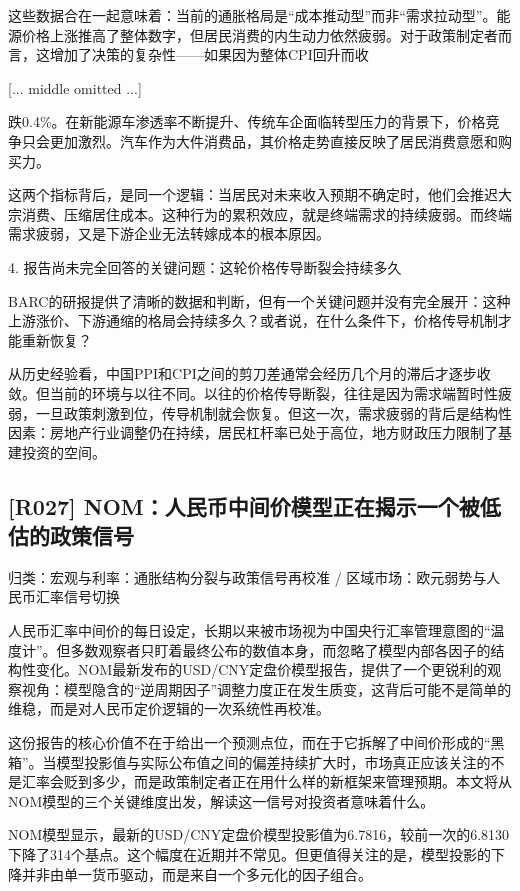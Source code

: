 \documentclass[11pt]{ctexart}
\begin{document}
这些数据合在一起意味着：当前的通胀格局是“成本推动型”而非“需求拉动型”。能源价格上涨推高了整体数字，但居民消费的内生动力依然疲弱。对于政策制定者而言，这增加了决策的复杂性——如果因为整体CPI回升而收

[... middle omitted ...]

跌0.4\%。在新能源车渗透率不断提升、传统车企面临转型压力的背景下，价格竞争只会更加激烈。汽车作为大件消费品，其价格走势直接反映了居民消费意愿和购买力。

这两个指标背后，是同一个逻辑：当居民对未来收入预期不确定时，他们会推迟大宗消费、压缩居住成本。这种行为的累积效应，就是终端需求的持续疲弱。而终端需求疲弱，又是下游企业无法转嫁成本的根本原因。

4. 报告尚未完全回答的关键问题：这轮价格传导断裂会持续多久

BARC的研报提供了清晰的数据和判断，但有一个关键问题并没有完全展开：这种上游涨价、下游通缩的格局会持续多久？或者说，在什么条件下，价格传导机制才能重新恢复？

从历史经验看，中国PPI和CPI之间的剪刀差通常会经历几个月的滞后才逐步收敛。但当前的环境与以往不同。以往的价格传导断裂，往往是因为需求端暂时性疲弱，一旦政策刺激到位，传导机制就会恢复。但这一次，需求疲弱的背后是结构性因素：房地产行业调整仍在持续，居民杠杆率已处于高位，地方财政压力限制了基建投资的空间。

\subsection{[R027] NOM：人民币中间价模型正在揭示一个被低估的政策信号}
{\small\color{refgray}归类：宏观与利率：通胀结构分裂与政策信号再校准 / 区域市场：欧元弱势与人民币汇率信号切换}

人民币汇率中间价的每日设定，长期以来被市场视为中国央行汇率管理意图的“温度计”。但多数观察者只盯着最终公布的数值本身，而忽略了模型内部各因子的结构性变化。NOM最新发布的USD/CNY定盘价模型报告，提供了一个更锐利的观察视角：模型隐含的“逆周期因子”调整力度正在发生质变，这背后可能不是简单的维稳，而是对人民币定价逻辑的一次系统性再校准。

这份报告的核心价值不在于给出一个预测点位，而在于它拆解了中间价形成的“黑箱”。当模型投影值与实际公布值之间的偏差持续扩大时，市场真正应该关注的不是汇率会贬到多少，而是政策制定者正在用什么样的新框架来管理预期。本文将从NOM模型的三个关键维度出发，解读这一信号对投资者意味着什么。

NOM模型显示，最新的USD/CNY定盘价模型投影值为6.7816，较前一次的6.8130下降了314个基点。这个幅度在近期并不常见。但更值得关注的是，模型投影的下降并非由单一货币驱动，而是来自一个多元化的因子组合。
\end{document}
